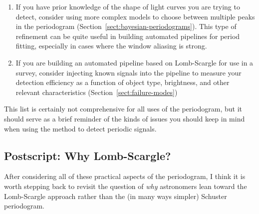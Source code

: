 \documentclass[preprint]{aastex}
\newcommand{\fig}[1]{Figure~\ref{fig:#1}}
\newcommand{\Sect}[1]{Section~\ref{sect:#1}}
\newcommand{\sect}[1]{\Sect{#1}}
\newcommand{\sectlabel}[1]{\label{sect:#1}}
\begin{document}
\begin{enumerate}
    multiple maxima and plot the phased light curve at each.
    If there is indication that the sinusoidal model under-fits the data
    (cf. \fig{binary-multiterm}) then consider
    re-fitting with a multi-term Fourier model (\sect{multiterm}).
  \item If you have prior knowledge of the shape of light curves you are
    trying to detect, consider using more complex models to choose between
    multiple peaks in the periodogram (\sect{bayesian-periodograms}).
    This type of refinement can be quite useful in building automated
    pipelines for period fitting, especially in cases where the window
    aliasing is strong.
  \item If you are building an automated pipeline based on Lomb-Scargle for
    use in a survey, consider injecting known signals into the pipeline to
    measure your detection efficiency as a function of object type, brightness,
    and other relevant characteristics (\sect{failure-modes})
\end{enumerate}
This list is certainly not comprehensive for all uses of the periodogram, but
it should serve as a brief reminder of the kinds of issues you should keep
in mind when using the method to detect periodic signals.


\subsection{Postscript: Why Lomb-Scargle?}
\sectlabel{postscript}
After considering all of these practical aspects of the periodogram,
I think it is worth stepping back to
revisit the question of {\it why} astronomers lean toward the
Lomb-Scargle approach rather than the (in many ways simpler) Schuster
periodogram.
\end{document}
